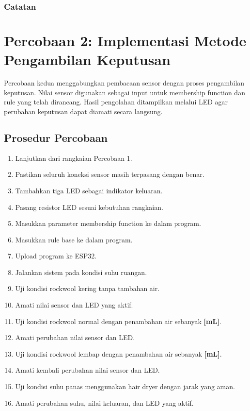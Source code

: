 \documentclass[12pt,a4paper]{article}
\begin{document}
\subsubsection*{Catatan}

\noindent
\makebox[\textwidth]{\hrulefill}

\vspace{0.4cm}
\makebox[\textwidth]{\hrulefill}

\vspace{0.4cm}
\makebox[\textwidth]{\hrulefill}

\section{Percobaan 2: Implementasi Metode Pengambilan Keputusan}

Percobaan kedua menggabungkan pembacaan sensor dengan proses pengambilan keputusan. Nilai sensor digunakan sebagai input untuk membership function dan rule yang telah dirancang. Hasil pengolahan ditampilkan melalui LED agar perubahan keputusan dapat diamati secara langsung.

\subsection{Prosedur Percobaan}

\begin{enumerate}
    \item Lanjutkan dari rangkaian Percobaan 1.
    \item Pastikan seluruh koneksi sensor masih terpasang dengan benar.
    \item Tambahkan tiga LED sebagai indikator keluaran.
    \item Pasang resistor LED sesuai kebutuhan rangkaian.
    \item Masukkan parameter membership function ke dalam program.
    \item Masukkan rule base ke dalam program.
    \item Upload program ke ESP32.
    \item Jalankan sistem pada kondisi suhu ruangan.
    \item Uji kondisi rockwool kering tanpa tambahan air.
    \item Amati nilai sensor dan LED yang aktif.
    \item Uji kondisi rockwool normal dengan penambahan air sebanyak \textbf{[}\underline{\phantom{mL}}\textbf{mL]}.
    \item Amati perubahan nilai sensor dan LED.
    \item Uji kondisi rockwool lembap dengan penambahan air sebanyak \textbf{[}\underline{\phantom{mL}}\textbf{mL]}.
    \item Amati kembali perubahan nilai sensor dan LED.
    \item Uji kondisi suhu panas menggunakan hair dryer dengan jarak yang aman.
    \item Amati perubahan suhu, nilai keluaran, dan LED yang aktif.
\end{enumerate}
\end{document}

